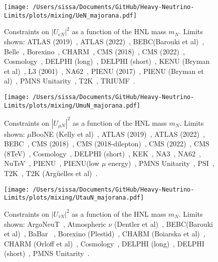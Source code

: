 \documentclass{revtex4-1}%
\begin{document}
%
\normalsize%


\begin{figure}[h!]%
\centering%
\texttt{[image: /Users/sissa/Documents/GitHub/Heavy-Neutrino-Limits/plots/mixing/UeN\_majorana.pdf]}%
\caption{Constraints on $|U_{e N}|^2$ as a function of the HNL mass $m_N$. Limits shown: ATLAS (2019)~\cite{ATLAS:2019kpx}, ATLAS (2022)~\cite{ATLAS:2022atq}, BEBC(Barouki et al)~\cite{Barouki:2022bkt}, Belle~\cite{Belle:2013ytx}, Borexino~\cite{Borexino:2013bot}, CHARM~\cite{CHARM:1985nku}, CMS (2018)~\cite{CMS:2018iaf}, CMS (2022)~\cite{CMS:2022fut}, Cosmology~\cite{Sabti:2020yrt}, DELPHI (long)~\cite{DELPHI:1996qcc}, DELPHI (short)~\cite{DELPHI:1996qcc}, KENU (Bryman et al)~\cite{Bryman:2019bjg}, L3 (2001)~\cite{L3:2001zfe}, NA62~\cite{NA62:2020mcv}, PIENU (2017)~\cite{PIENU:2017wbj}, PIENU (Bryman et al)~\cite{Bryman:2019bjg}, PMNS Unitarity~\cite{Workinprogress}, T2K~\cite{T2K:2019jwa}, TRIUMF~\cite{Britton:1992xv}.}%
\end{figure}

%


\begin{figure}[h!]%
\centering%
\texttt{[image: /Users/sissa/Documents/GitHub/Heavy-Neutrino-Limits/plots/mixing/UmuN\_majorana.pdf]}%
\caption{Constraints on $|U_{\mu N}|^2$ as a function of the HNL mass $m_N$. Limits shown: $\mu$BooNE (Kelly et al)~\cite{Kelly:2021xbv}, ATLAS (2019)~\cite{ATLAS:2019kpx}, ATLAS (2022)~\cite{ATLAS:2022atq}, BEBC~\cite{WA66:1985mfx}, CMS (2018)~\cite{CMS:2018iaf}, CMS (2018-dilepton)~\cite{CMS:2018jxx}, CMS (2022)~\cite{CMS:2022fut}, CMS (8TeV)~\cite{CMS:2016aro}, Cosmology~\cite{Sabti:2020yrt}, DELPHI (short)~\cite{DELPHI:1996qcc}, KEK~\cite{Bryman:2019bjg}, NA3~\cite{NA3:1986ahv}, NA62~\cite{NA62:2021bji}, NuTeV~\cite{NuTeV:1999kej}, PIENU~\cite{PIENU:2019usb}, PIENU(low $\mu$ energy)~\cite{PIENU:2019usb}, PMNS Unitarity~\cite{Workinprogress}, PSI~\cite{Daum:1987bg}, T2K~\cite{T2K:2019jwa}, T2K (Arg\"uelles et al)~\cite{Arguelles:2021dqn}.}%
\end{figure}

%


\begin{figure}[h!]%
\centering%
\texttt{[image: /Users/sissa/Documents/GitHub/Heavy-Neutrino-Limits/plots/mixing/UtauN\_majorana.pdf]}%
\caption{Constraints on $|U_{\tau N}|^2$ as a function of the HNL mass $m_N$. Limits shown: ArgoNeuT~\cite{ArgoNeuT:2021clc}, Atmospheric $\nu$ (Dentler et al)~\cite{Dentler:2018sju}, BEBC(Barouki et al)~\cite{Barouki:2022bkt}, BaBar ~\cite{BaBar:2022cqj}, Borexino (Plestid)~\cite{Plestid:2020ssy}, CHARM (Boiarska et al)~\cite{Boiarska:2021yho}, CHARM (Orloff et al)~\cite{Orloff:2002de}, Cosmology~\cite{Sabti:2020yrt}, DELPHI (long)~\cite{DELPHI:1996qcc}, DELPHI (short)~\cite{DELPHI:1996qcc}, PMNS Unitarity~\cite{Workinprogress}.}%
\end{figure}

%
%
%
\end{document}
